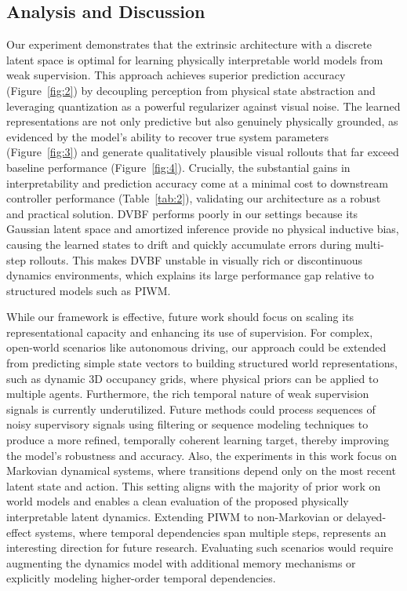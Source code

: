 \documentclass[sigconf]{acmart}
\begin{document}
\subsection{Analysis and Discussion}



Our experiment demonstrates that the extrinsic architecture with a discrete latent space is optimal for learning physically interpretable world models from weak supervision. This approach achieves superior prediction accuracy (Figure~\ref{fig:2}) by decoupling perception from physical state abstraction and leveraging quantization as a powerful regularizer against visual noise. The learned representations are not only predictive but also genuinely physically grounded, as evidenced by the model's ability to recover true system parameters (Figure~\ref{fig:3}) and generate qualitatively plausible visual rollouts that far exceed baseline performance (Figure~\ref{fig:4}). Crucially, the substantial gains in interpretability and prediction accuracy come at a minimal cost to downstream controller performance (Table~\ref{tab:2}), validating our architecture as a robust and practical solution. DVBF performs poorly in our settings because its Gaussian latent space and amortized inference provide no physical inductive bias, causing the learned states to drift and quickly accumulate errors during multi-step rollouts. This makes DVBF unstable in visually rich or discontinuous dynamics environments, which explains its large performance gap relative to structured models such as PIWM.


While our framework is effective, future work should focus on scaling its representational capacity and enhancing its use of supervision. For complex, open-world scenarios like autonomous driving, our approach could be extended from predicting simple state vectors to building structured world representations, such as dynamic 3D occupancy grids, where physical priors can be applied to multiple agents. Furthermore, the rich temporal nature of weak supervision signals is currently underutilized. Future methods could process sequences of noisy supervisory signals using filtering or sequence modeling techniques to produce a more refined, temporally coherent learning target, thereby improving the model's robustness and accuracy. Also, the experiments in this work focus on Markovian dynamical systems, where transitions depend only on the most recent latent state and action. This setting aligns with the majority of prior work on world models and enables a clean evaluation of the proposed physically interpretable latent dynamics. Extending PIWM to non-Markovian or delayed-effect systems, where temporal dependencies span multiple steps, represents an interesting direction for future research. Evaluating such scenarios would require augmenting the dynamics model with additional memory mechanisms or explicitly modeling higher-order temporal dependencies.
\end{document}
